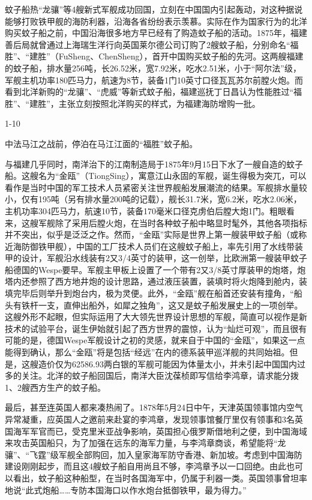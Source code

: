 \documentclass[12pt,UTF8]{ctexbook}
\begin{document}
蚊子船热“龙骧”等4艘新式军舰成功回国，立刻在中国国内引起轰动，对这种据说能够打败铁甲舰的海防利器，沿海各省纷纷表示羡慕。实际在作为国家行为的北洋购买蚊子船之前，中国沿海很多地方早已经有了购造蚊子船的活动。1875年，福建善后局就曾通过上海瑞生洋行向英国莱尔德公司订购了2艘蚊子船，分别命名“福胜”、“建胜”（FuSheng、ChenSheng），首开中国购买蚊子船的先河。这两艘福建的蚊子船，排水量256吨，长26.52米，宽7.92米，吃水2.51米，小于“阿尔法”级，军舰主机功率180匹马力，航速为8节，装备1门10英寸口径瓦瓦苏尔前膛火炮。而看到北洋新购的“龙骧”、“虎威”等新式蚊子船，福建巡抚丁日昌认为性能胜过“福胜”、“建胜”，主张立刻按照北洋购买的样式，为福建海防增购一批。

1-10

中法马江之战前，停泊在马江江面的“福胜”蚊子船。

与福建几乎同时，南洋治下的江南制造局于1875年9月15日下水了一艘自造的蚊子船。这艘名为“金瓯”（TiongSing），寓意江山永固的军舰，诞生得极为突兀，可以看作是当时中国的军工技术人员紧密关注世界舰船发展潮流的结果。军舰排水量较小，仅有195吨（另有排水量200吨的记载），舰长31.7米，宽6.2米，吃水2.06米，主机功率304匹马力，航速10节，装备170毫米口径克虏伯后膛大炮1门。粗眼看来，这艘军舰除了采用后膛火炮，在当时各种蚊子船中略显时髦外，其他各项指标并不突出，似乎是泛泛之作。然而，“金瓯”实际是世界上第一艘装甲蚊子船（或称近海防御铁甲舰），中国的工厂技术人员们在这艘蚊子船上，率先引用了水线带装甲的设计，军舰沿水线装有2又3/4英寸的装甲，这一创举，比欧洲第一艘装甲蚊子船德国的Wespe要早。军舰主甲板上设置了一个带有2又3/8英寸厚装甲的炮塔，炮塔内还参照了西方地井炮的设计思路，通过液压装置，装填时将火炮降到舱内，装填完毕后则举升到炮台内，极为灵便。此外，“金瓯”舰在船首还安装有撞角，“船头有铁杆一支，直伸出船外，如犀之独角”，这又是蚊子船发展史上的一项创举。这艘外形不起眼，但实际运用了大大领先世界设计思想的军舰，简直可以视作是新技术的试验平台，诞生伊始就引起了西方世界的震惊，认为“灿烂可观”，而且很有可能的是，德国Wespe军舰设计之初的灵感，就来自于中国的“金瓯”，如果这一点能得到确认，那么“金瓯”将是包括“经远”在内的德系装甲巡洋舰的共同始祖。但是，这艘造价仅为62586.93两白银的军舰可能因为体量太小，并未引起中国国内过多的关注。北洋的蚊子船回国后，南洋大臣沈葆桢即写信给李鸿章，请求能分拨1、2艘西方生产的蚊子船。

最后，甚至连英国人都来凑热闹了。1878年5月24日中午，天津英国领事馆内空气异常凝重，应英国人之邀前来赴宴的李鸿章，发现领事馆餐厅里仅有领事和3名英国海军军官而已，受克里米亚战争影响，英国担心俄罗斯借地利之便，到中国海域来攻击英国船只，为了加强在远东的海军力量，与李鸿章商谈，希望能将“龙骧”、“飞霆”级军舰全部购回，加入皇家海军防守香港、新加坡。考虑到中国海防建设刚刚起步，而且这4艘蚊子船自用尚且不够，李鸿章予以一口回绝。由此也可以看出，蚊子船这种船型，在当时各国海军中，仍属于利器一类。英国领事曾坦率地说“此式炮船……专防本国海口以作水炮台抵御铁甲，最为得力。”
\end{document}
